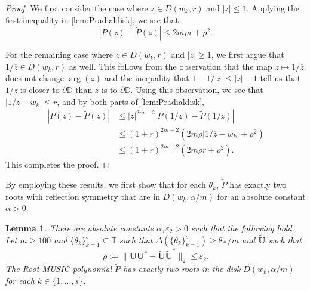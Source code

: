 \documentclass[11pt]{article}
\newtheorem{lemma}[theorem]{Lemma}
\theoremstyle{definition}
\numberwithin{theorem}{section}
\numberwithin{equation}{section}
\def\D{\mathbb{D}}
\def\T{\mathbb{T}}
\renewcommand{\subset}{\subseteq}
\renewcommand{\tilde}{\widetilde}
\renewcommand{\epsilon}{\varepsilon}
\newcommand{\bfU}{{\boldsymbol U}}
\numberwithin{equation}{section}
\begin{document}
\begin{proof}
    We first consider the case where $z\in D(w_k,r)$ and $|z|\leq 1$. Applying the first inequality in \cref{lem:Pradialdisk}, we see that
    $$
    |P(z)-\tilde P(z)| 
    \leq 2m \rho r + \rho^2. 
    $$
    
    For the remaining case where $z\in D(w_k,r)$ and $|z|\geq 1$, we first argue that $1/\overline z \in D(w_k,r)$ as well. This follows from the observation that the map $z\mapsto 1/\overline z$ does not change $\arg(z)$ and the inequality that $1-1/|z|\leq |z|-1$ tell us that $1/\overline z$ is closer to $\partial \D$ than $z$ is to $\partial\D$. Using this observation, we see that $|1/\overline z - w_k|\leq r$, and by both parts of \cref{lem:Pradialdisk},
    \begin{align*}
        |P(z)-\tilde P(z)| 
        &\leq |z|^{2m-2} |P(1/\overline z) - \tilde P(1/\overline z)| \\
        &\leq (1+r)^{2m-2} \left( 2m \rho |1/\overline z - w_k| + \rho^2 \right) \\
        &\leq (1+r)^{2m-2} \left( 2m \rho r + \rho^2 \right).
    \end{align*}
    This completes the proof. 
\end{proof}

By employing these results, we first show that for each $\theta_k$, $\tilde P$ has exactly two roots with reflection symmetry that are in $D(w_k,\alpha/m)$ for an absolute constant $\alpha>0$.
\begin{lemma}\label{lem:coarseroots}
    There are absolute constants $\alpha,\epsilon_2>0$ such that the following hold. Let $m\geq 100$ and $\{\theta_k\}_{k=1}^s\subset\T$ such that $\Delta(\{\theta_k\}_{k=1}^s)\geq 8\pi/m$ and $\tilde\bfU$ such that 
    $$
    \rho:=\|\bfU\bfU^*-\tilde\bfU\tilde\bfU^*\|_2\leq \epsilon_2.
    $$
    The Root-MUSIC polynomial $\tilde P$ has exactly two roots in the disk $D(w_k,\alpha/m)$ for each $k\in \{1,\dots,s\}$.
\end{lemma}
\end{document}
